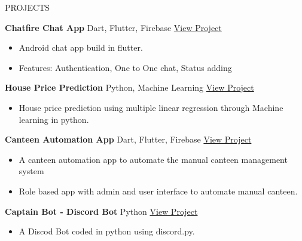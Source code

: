 \documentclass{resume} %
\begin{document}
%
%
    
\begin{rSection}{PROJECTS}
\vspace{-1.25em}

\item \textbf{Chatfire Chat App} {Dart, Flutter, Firebase} \hfill \href{https://github.com/anotherwebguy/Chat-App-Flutter.git}{View Project}
\vspace{-0.2cm}
\begin{itemize}
    \setlength\itemsep{-0.7em}
     \item Android chat app build in flutter.
     \item Features: Authentication, One to One chat, Status adding 
 \end{itemize}
 
\item \textbf{House Price Prediction } {Python, Machine Learning} \hfill \href{https://github.com/anotherwebguy/House-price-prediction.git}{View Project}
\vspace{-0.2cm}
\begin{itemize}
    \setlength\itemsep{-0.7em}
     \item House price prediction using multiple linear regression through Machine learning in python.
 \end{itemize}
 
\item \textbf{Canteen Automation App} {Dart, Flutter, Firebase} \hfill \href{https://github.com/anotherwebguy/Canteen-Automation-App.git}{View Project}
\vspace{-0.2cm}
\begin{itemize}
    \setlength\itemsep{-0.7em}
     \item A canteen automation app to automate the manual canteen management system
     \item Role based app with admin and user interface to automate manual canteen. 
 \end{itemize}
 
\item \textbf{Captain Bot - Discord Bot} {Python} \hfill \href{https://github.com/anotherwebguy/Captain-Bot.git}{View Project}
\vspace{-0.2cm}
\begin{itemize}
    \setlength\itemsep{-0.7em}
     \item A Discod Bot coded in python using discord.py.
 \end{itemize}

\end{rSection} 
\end{document}
